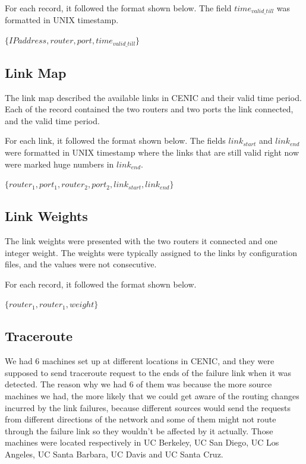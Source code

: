 \documentclass[conference, twocolumn, oneside, 10pt]{IEEEtran}
\begin{document}
For each record, it followed the format shown below. The field $time_{valid\_till}$ was formatted in UNIX timestamp.

$\{IP address, router, port, time_{valid\_till}\}$

\subsection{Link Map}

The link map described the available links in CENIC and their valid time period. Each of the record contained the two routers and two ports the link connected, and the valid time period.

For each link, it followed the format shown below. The fields $link_{start}$ and $link_{end}$ were formatted in UNIX timestamp where the links that are still valid right now were marked huge numbers in $link_{end}$.

$\{router_1, port_1, router_2, port_2, link_{start}, link_{end}\}$

\subsection{Link Weights}

The link weights were presented with the two routers it connected and one integer weight. The weights were typically assigned to the links by configuration files, and the values were not consecutive.

For each record, it followed the format shown below.

$\{router_1, router_1, weight\}$

\subsection{Traceroute}

We had 6 machines set up at different locations in CENIC, and they were supposed to send traceroute request to the ends of the failure link when it was detected. The reason why we had 6 of them was because the more source machines we had, the more likely that we could get aware of the routing changes incurred by the link failures, because different sources would send the requests from different directions of the network and some of them might not route through the failure link so they wouldn't be affected by it actually. Those machines were located respectively in UC Berkeley, UC San Diego, UC Los Angeles, UC Santa Barbara, UC Davis and UC Santa Cruz.
\end{document}

